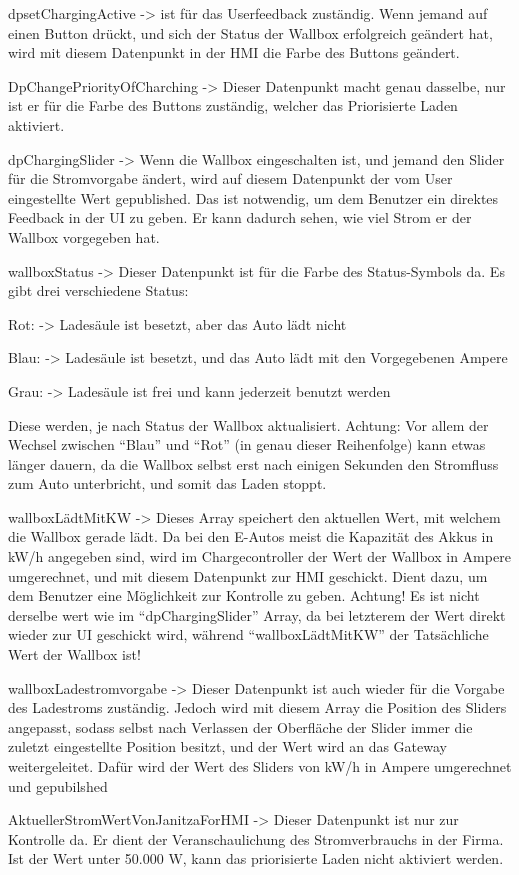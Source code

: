 \begin{compactitem}
  \item dpsetChargingActive -> ist für das Userfeedback zuständig.  Wenn jemand auf einen Button drückt, und sich der Status der Wallbox erfolgreich geändert hat, wird mit diesem Datenpunkt in der HMI die Farbe des Buttons geändert. 
  \item DpChangePriorityOfCharching -> Dieser Datenpunkt macht genau dasselbe, nur ist er für die Farbe des Buttons zuständig, welcher das Priorisierte Laden aktiviert. 
  \item dpChargingSlider -> Wenn die Wallbox eingeschalten ist, und jemand den Slider für die Stromvorgabe ändert, wird auf diesem Datenpunkt der vom User eingestellte Wert gepublished. Das ist notwendig, um dem Benutzer ein direktes Feedback in der UI zu geben. Er kann dadurch sehen, wie viel Strom er der Wallbox vorgegeben hat. 
  \item wallboxStatus -> Dieser Datenpunkt ist für die Farbe des Status-Symbols da. Es gibt drei verschiedene Status: 
  \begin{compactitem}
    \item Rot: -> Ladesäule ist besetzt, aber das Auto lädt nicht 
    \item Blau: -> Ladesäule ist besetzt, und das Auto lädt mit den Vorgegebenen Ampere 
    \item Grau: -> Ladesäule ist frei und kann jederzeit benutzt werden 
  \end{compactitem}
  Diese werden, je nach Status der Wallbox aktualisiert. Achtung: Vor allem der Wechsel zwischen “Blau” und “Rot” (in genau dieser Reihenfolge) kann etwas länger dauern, da die Wallbox selbst erst nach einigen Sekunden den Stromfluss zum Auto unterbricht, und somit das Laden stoppt. 

 \item wallboxLädtMitKW -> Dieses Array speichert den aktuellen Wert, mit welchem die Wallbox gerade lädt. Da bei den E-Autos meist die Kapazität des Akkus in kW/h angegeben sind, wird im Chargecontroller der Wert der Wallbox in Ampere umgerechnet, und mit diesem Datenpunkt zur HMI geschickt. Dient dazu, um dem Benutzer eine Möglichkeit zur Kontrolle zu geben. Achtung! Es ist nicht derselbe wert wie im “dpChargingSlider” Array, da bei letzterem der Wert direkt wieder zur UI geschickt wird, während “wallboxLädtMitKW” der Tatsächliche Wert der Wallbox ist! 
 \item wallboxLadestromvorgabe -> Dieser Datenpunkt ist auch wieder für die Vorgabe des Ladestroms zuständig. Jedoch wird mit diesem Array die Position des Sliders angepasst, sodass selbst nach Verlassen der Oberfläche der Slider immer die zuletzt eingestellte Position besitzt, und der Wert wird an das Gateway weitergeleitet. Dafür wird der Wert des Sliders von kW/h in Ampere umgerechnet und gepubilshed 
 \item AktuellerStromWertVonJanitzaForHMI -> Dieser Datenpunkt ist nur zur Kontrolle da. Er dient der Veranschaulichung des Stromverbrauchs in der Firma. Ist der Wert unter 50.000 W, kann das priorisierte Laden nicht aktiviert werden. 
\end{compactitem}

